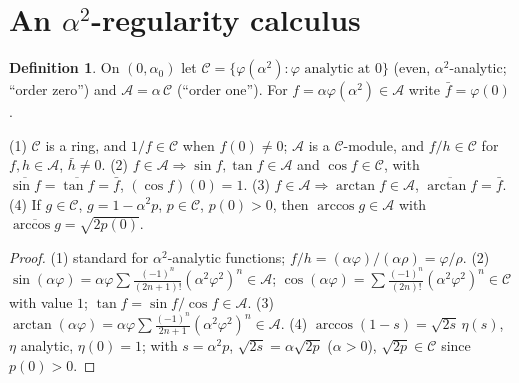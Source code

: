 \documentclass[11pt]{article}
\theoremstyle{definition}\newtheorem{definition}{Definition}\newtheorem{remark}{Remark}
\begin{document}
\section{An $\alpha^2$-regularity calculus}
\begin{definition}
On $(0,\alpha_0)$ let $\mathcal C=\{\varphi(\alpha^2):\varphi\text{ analytic at }0\}$
(even, $\alpha^2$-analytic; ``order zero'') and $\mathcal A=\alpha\,\mathcal C$
(``order one''). For $f=\alpha\varphi(\alpha^2)\in\mathcal A$ write $\bar f=\varphi(0)$.
\end{definition}

\begin{lemma}[Calculus]\label{lem:calc}
\textup{(1)} $\mathcal C$ is a ring, and $1/f\in\mathcal C$ when $f(0)\neq0$;
$\mathcal A$ is a $\mathcal C$-module, and $f/h\in\mathcal C$ for $f,h\in\mathcal A$,
$\bar h\neq0$.
\textup{(2)} $f\in\mathcal A\Rightarrow\sin f,\tan f\in\mathcal A$ and
$\cos f\in\mathcal C$, with $\overline{\sin f}=\overline{\tan f}=\bar f$,
$(\cos f)(0)=1$.
\textup{(3)} $f\in\mathcal A\Rightarrow\arctan f\in\mathcal A$,
$\overline{\arctan f}=\bar f$.
\textup{(4)} If $g\in\mathcal C$, $g=1-\alpha^2p$, $p\in\mathcal C$, $p(0)>0$, then
$\arccos g\in\mathcal A$ with $\overline{\arccos g}=\sqrt{2p(0)}$.
\end{lemma}
\begin{proof}
(1) standard for $\alpha^2$-analytic functions; $f/h=(\alpha\varphi)/(\alpha\rho)=\varphi/\rho$.
(2) $\sin(\alpha\varphi)=\alpha\varphi\sum\frac{(-1)^n}{(2n+1)!}(\alpha^2\varphi^2)^n\in\mathcal A$;
$\cos(\alpha\varphi)=\sum\frac{(-1)^n}{(2n)!}(\alpha^2\varphi^2)^n\in\mathcal C$ with value $1$;
$\tan f=\sin f/\cos f\in\mathcal A$.
(3) $\arctan(\alpha\varphi)=\alpha\varphi\sum\frac{(-1)^n}{2n+1}(\alpha^2\varphi^2)^n\in\mathcal A$.
(4) $\arccos(1-s)=\sqrt{2s}\,\eta(s)$, $\eta$ analytic, $\eta(0)=1$; with $s=\alpha^2p$,
$\sqrt{2s}=\alpha\sqrt{2p}$ ($\alpha>0$), $\sqrt{2p}\in\mathcal C$ since $p(0)>0$.
\end{proof}
\end{document}
